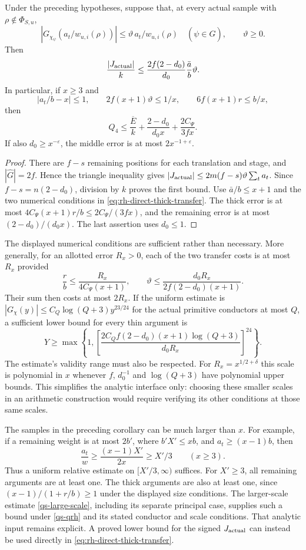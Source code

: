 \begin{corollary}
\label{rh-direct-thin-estimate}
Under the preceding hypotheses, suppose that, at every actual sample
with $\rho\notin\Phi_{S,u}$,
\[
 |G_{\chi_\psi}(a_t/w_{u,i}(\rho))|
        \le\vartheta\,a_t/w_{u,i}(\rho)
        \quad(\psi\in\widehat G),\qquad\vartheta\ge0.
\]
Then
\[
 \frac{|J_{\rm actual}|}{k}\le
       \frac{2f(2-d_0)}{d_0}\frac{\bar a}{b}\vartheta.
\]
In particular, if $x\ge3$ and
\[
 |a_t/b-x|\le1,\qquad
 2f(x+1)\vartheta\le1/x,\qquad
 6f(x+1)r\le b/x,
\]
then
\begin{equation}\label{eq:rh-direct-numerical}
 Q_4\le\frac{\overline E}{k}
           +\frac{2-d_0}{d_0x}+\frac{2C_\Psi}{3fx}.
\end{equation}
If also $d_0\ge x^{-\varepsilon}$, the middle error is at most
$2x^{-1+\varepsilon}$.
\end{corollary}
\begin{proof}
There are $f-s$ remaining positions for each translation and stage,
and $|\widehat G|=2f$. Hence the triangle inequality gives
$|J_{\rm actual}|\le2m(f-s)\vartheta\sum_ta_t$.
Since $f-s=n(2-d_0)$, division by $k$ proves the first bound.
Use $\bar a/b\le x+1$ and the two numerical conditions in
\eqref{eq:rh-direct-thick-transfer}. The thick error is at most
$4C_\Psi(x+1)r/b\le2C_\Psi/(3fx)$, and the remaining error
is at most $(2-d_0)/(d_0x)$. The last assertion uses $d_0\le1$.
\end{proof}

The displayed numerical conditions are sufficient rather than necessary.
More generally, for an allotted error $R_x>0$, each of the two transfer
costs is at most $R_x$ provided
\[
 \frac rb\le\frac{R_x}{4C_\Psi(x+1)},\qquad
 \vartheta\le\frac{d_0R_x}{2f(2-d_0)(x+1)}.
\]
Their sum then costs at most $2R_x$. If the uniform estimate is
$|G_\chi(y)|\le C_Q\log(Q+3)y^{23/24}$ for the actual primitive
conductors at most $Q$, a sufficient lower bound for every thin argument is
\[
 Y\ge\max\left\{1,
 \left[\frac{2C_Qf(2-d_0)(x+1)\log(Q+3)}{d_0R_x}\right]^{24}
 \right\}.
\]
The estimate's validity range must also be respected. For
$R_x=x^{1/2+\delta}$ this scale is polynomial in $x$ whenever
$f$, $d_0^{-1}$ and $\log(Q+3)$ have polynomial upper bounds.
This simplifies the analytic interface only: choosing these smaller
scales in an arithmetic construction would require verifying its other
conditions at those same scales.

The samples in the preceding corollary can be much larger than $x$.
For example, if a remaining weight is at most $2b'$, where
$b'X'\le xb$, and $a_t\ge(x-1)b$, then
\[
 \frac{a_t}{w}\ge\frac{(x-1)X'}{2x}\ge X'/3
       \qquad(x\ge3).
\]
Thus a uniform relative estimate on $[X'/3,\infty)$ suffices.
For $X'\ge3$, all remaining arguments are at least one. The thick
arguments are also at least one, since
$(x-1)/(1+r/b)\ge1$ under the displayed size conditions.
The larger-scale estimate \eqref{qs-large-scale}, including its
separate principal case, supplies such a bound under
\eqref{qs-qrh} and its stated conductor and scale conditions.
That analytic input remains explicit. A proved lower bound for the
signed $J_{\rm actual}$ can instead be used directly in
\eqref{eq:rh-direct-thick-transfer}.

